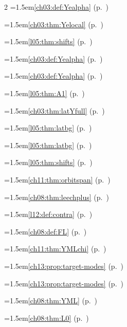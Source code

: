 \begin{multicols}{2}
\hangindent=1.5em\quad \ref{ch03:def:Yealpha} (p.~\pageref{ch03:def:Yealpha})\par
\hangindent=1.5em\quad \ref{ch03:thm:Yelocal} (p.~\pageref{ch03:thm:Yelocal})\par
\hangindent=1.5em\quad \ref{l05:thm:shifts} (p.~\pageref{l05:thm:shifts})\par
\hangindent=1.5em\quad \ref{ch03:def:Yealpha} (p.~\pageref{ch03:def:Yealpha})\par
\hangindent=1.5em\quad \ref{ch03:def:Yealpha} (p.~\pageref{ch03:def:Yealpha})\par
\hangindent=1.5em\quad \ref{l05:thm:A1} (p.~\pageref{l05:thm:A1})\par
\hangindent=1.5em\quad \ref{ch03:thm:latYfull} (p.~\pageref{ch03:thm:latYfull})\par
\hangindent=1.5em\quad \ref{l05:thm:latbg} (p.~\pageref{l05:thm:latbg})\par
\hangindent=1.5em\quad \ref{l05:thm:latbg} (p.~\pageref{l05:thm:latbg})\par
\hangindent=1.5em\quad \ref{l05:thm:shifts} (p.~\pageref{l05:thm:shifts})\par
\hangindent=1.5em\quad \ref{ch11:thm:orbitspan} (p.~\pageref{ch11:thm:orbitspan})\par
\hangindent=1.5em\quad \ref{ch08:thm:leechplus} (p.~\pageref{ch08:thm:leechplus})\par
\hangindent=1.5em\quad \ref{l12:def:contra} (p.~\pageref{l12:def:contra})\par
\hangindent=1.5em\quad \ref{ch08:def:FL} (p.~\pageref{ch08:def:FL})\par
\hangindent=1.5em\quad \ref{ch11:thm:YMLchi} (p.~\pageref{ch11:thm:YMLchi})\par
\hangindent=1.5em\quad \ref{ch13:prop:target-modes} (p.~\pageref{ch13:prop:target-modes})\par
\hangindent=1.5em\quad \ref{ch13:prop:target-modes} (p.~\pageref{ch13:prop:target-modes})\par
\hangindent=1.5em\quad \ref{ch08:thm:YML} (p.~\pageref{ch08:thm:YML})\par
\hangindent=1.5em\quad \ref{ch08:thm:L0} (p.~\pageref{ch08:thm:L0})\par

\end{multicols}
